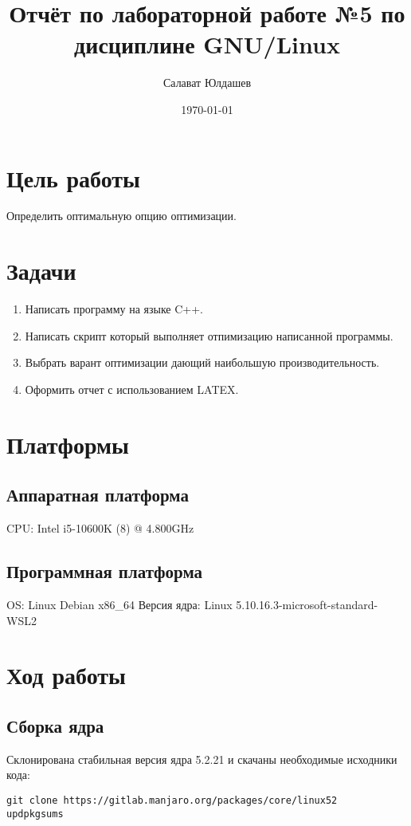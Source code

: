 \documentclass[a4paper,11pt]{article}
\title{Отчёт по лабораторной работе №5 по дисциплине GNU/Linux}
\author{Салават Юлдашев}
\date{\today}
\begin{document}
\maketitle
\newpage

\section{Цель работы}
  Определить оптимальную опцию оптимизации.

\section{Задачи}
  \begin{enumerate}
    \item Написать программу на языке C++.
    \item Написать скрипт который выполняет отпимизацию написанной программы.
    \item Выбрать варант оптимизации дающий наибольшую производительность.
    \item Оформить отчет с использованием LATEX.
  \end{enumerate}

\section{Платформы}
  \subsection{Аппаратная платформа}
    CPU: Intel i5-10600K (8) @ 4.800GHz

  \subsection{Программная платформа}
    OS: Linux Debian x86\_64
    Версия ядра: Linux 5.10.16.3-microsoft-standard-WSL2

\newpage
\section{Ход работы}
  \subsection{Сборка ядра}
    \lstset{style=mycode}

    Склонирована стабильная версия ядра 5.2.21 и скачаны необходимые исходники кода:
    \begin{lstlisting}
git clone https://gitlab.manjaro.org/packages/core/linux52
updpkgsums
    \end{lstlisting}
\end{document}
